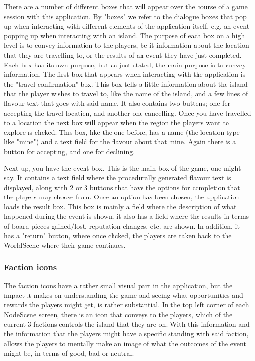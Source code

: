 There are a number of different boxes that will appear over the course of a game session with this application. By "boxes" we refer to the dialogue boxes that pop up when interacting with different elements of the application itself, e.g. an event popping up when interacting with an island.
The purpose of each box on a high level is to convey information to the players, be it information about the location that they are travelling to, or the results of an event they have just completed.
Each box has its own purpose, but as just stated, the main purpose is to convey information. The first box that appears when interacting with the application is the "travel confirmation" box. This box tells a little information about the island that the player wishes to travel to, like the name of the island, and a few lines of flavour text that goes with said name. It also contains two buttons; one for accepting the travel location, and another one cancelling.
Once you have travelled to a location the next box will appear when the region the players want to explore is clicked. This box, like the one before, has a name (the location type like "mine") and a text field for the flavour about that mine. Again there is a button for accepting, and one for declining. 

Next up, you have the event box. This is the main box of the game, one might say. It contains a text field where the procedurally generated flavour text is displayed, along with 2 or 3 buttons that have the options for completion that the players may choose from. 
Once an option has been chosen, the application loads the result box. This box is mainly a field where the description of what happened during the event is shown. it also has a field where the results in terms of board pieces gained/lost, reputation changes, etc. are shown. In addition, it has a "return" button, where once clicked, the players are taken back to the WorldScene where their game continues.


\subsubsection{Faction icons}
The faction icons have a rather small visual part in the application, but the impact it makes on understanding the game and seeing what opportunities and rewards the players might get, is rather substantial. In the top left corner of each NodeScene screen, there is an icon that conveys to the players, which of the current 3 factions controls the island that they are on. With this information and the information that the players might have a specific standing with said faction, allows the players to mentally make an image of what the outcomes of the event might be, in terms of good, bad or neutral.

